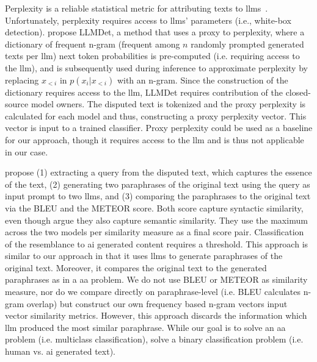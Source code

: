 Perplexity is a reliable statistical metric for attributing texts to \acp{llm}~\cite{zhang_llmdet_2023}.
Unfortunately, perplexity requires access to \acp{llm}' parameters (i.e., white-box detection).
\citet{zhang_llmdet_2023} propose LLMDet, a method that uses a proxy to perplexity, 
where a dictionary of frequent n-gram (frequent among $n$ randomly prompted generated texts per \ac{llm}) 
next token probabilities is pre-computed (i.e. requiring access to the \ac{llm}), 
and is subsequently used during inference to approximate perplexity by replacing $x_{<i}$ in $p(x_i | x_{<i})$ with an n-gram.
Since the construction of the dictionary requires access to the \ac{llm}, LLMDet requires contribution of the closed-source model owners.
The disputed text is tokenized and the proxy perplexity is calculated for each model and thus, constructing a proxy perplexity vector.
This vector is input to a trained classifier.
Proxy perplexity could be used as a baseline for our approach, though it requires access to the \ac{llm} and is thus not applicable in our case.

\citet{baradia_mirror_2025} propose (1) extracting a query from the disputed text, which captures the essence of the text, 
(2) generating two paraphrases of the original text using the query as input prompt to two \acp{llm}, 
and (3) comparing the paraphrases to the original text via the BLEU and the METEOR score.
Both score capture syntactic similarity, even though \citet{baradia_mirror_2025} argue they also capture semantic similarity.
They use the maximum across the two models per similarity measure as a final score pair.
Classification of the resemblance to \ac{ai} generated content requires a threshold.
This approach is similar to our approach in that it uses \acp{llm} to generate paraphrases of the original text.
Moreover, it compares the original text to the generated paraphrases as in a \ac{aa} problem. %
We do not use BLEU or METEOR as similarity measure, nor do we compare directly on paraphrase-level (i.e. BLEU calculates n-gram overlap) 
but construct our own frequency based n-gram vectors input vector similarity metrics.
However, this approach discards the information which \ac{llm} produced the most similar paraphrase. 
While our goal is to solve an \ac{aa} problem (i.e. multiclass classification), 
\citet{baradia_mirror_2025} solve a binary classification problem (i.e. human vs. \ac{ai} generated text).